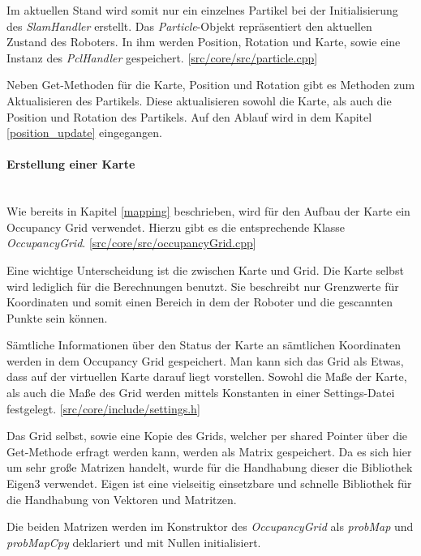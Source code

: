 Im aktuellen Stand wird somit nur ein einzelnes Partikel bei der Initialisierung des \textit{SlamHandler} erstellt.
Das \textit{Particle}-Objekt repräsentiert den aktuellen Zustand des Roboters.
In ihm werden Position, Rotation und Karte, sowie eine Instanz des \textit{PclHandler} gespeichert.
[\href{https://github.com/Jundy0/Studienarbeit/blob/main/src/core/src/particle.cpp}{src/core/src/particle.cpp}]

Neben Get-Methoden für die Karte, Position und Rotation gibt es Methoden zum Aktualisieren des Partikels.
Diese aktualisieren sowohl die Karte, als auch die Position und Rotation des Partikels.
Auf den Ablauf wird in dem Kapitel \ref{position_update} eingegangen.

\paragraph{Erstellung einer Karte} \mbox{} \\
Wie bereits in Kapitel \ref{mapping} beschrieben, wird für den Aufbau der Karte ein Occupancy Grid verwendet.
Hierzu gibt es die entsprechende Klasse \textit{OccupancyGrid}.
[\href{https://github.com/Jundy0/Studienarbeit/blob/main/src/core/src/occupancyGrid.cpp}{src/core/src/occupancyGrid.cpp}]

Eine wichtige Unterscheidung ist die zwischen Karte und Grid.
Die Karte selbst wird lediglich für die Berechnungen benutzt.
Sie beschreibt nur Grenzwerte für Koordinaten und somit einen Bereich in dem der Roboter und die gescannten Punkte sein können.

Sämtliche Informationen über den Status der Karte an sämtlichen Koordinaten werden in dem Occupancy Grid gespeichert.
Man kann sich das Grid als Etwas, dass auf der virtuellen Karte darauf liegt vorstellen.
Sowohl die Maße der Karte, als auch die Maße des Grid werden mittels Konstanten in einer Settings-Datei festgelegt.
[\href{https://github.com/Jundy0/Studienarbeit/blob/main/src/core/include/settings.h}{src/core/include/settings.h}]

Das Grid selbst, sowie eine Kopie des Grids, welcher per shared Pointer über die Get-Methode erfragt werden kann, werden als Matrix gespeichert.
Da es sich hier um sehr große Matrizen handelt, wurde für die Handhabung dieser die Bibliothek Eigen3 verwendet.
Eigen ist eine vielseitig einsetzbare und schnelle Bibliothek für die Handhabung von Vektoren und Matritzen.

Die beiden Matrizen werden im Konstruktor des \textit{OccupancyGrid} als \textit{probMap} und \textit{probMapCpy} deklariert und mit Nullen initialisiert.
\newline

